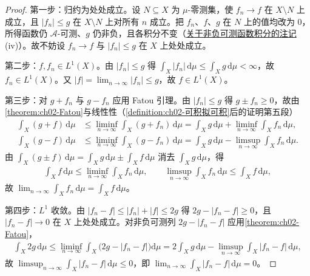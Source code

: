\documentclass[../../main.tex]{subfiles}%
\begin{document}
\begin{proof}
第一步：归约为处处成立。设 $N\subseteq X$ 为 $\mu$-零测集，使 $f_n\to f$ 在 $X\setminus N$ 上成立，且 $|f_n|\leqslant g$ 在 $X\setminus N$ 上对所有 $n$ 成立。把 $f_n$、$f$、$g$ 在 $N$ 上的值均改为 $0$，所得函数仍 $\mathscr A$-可测、$g$ 仍非负，且各积分不变（\hyperref[remark:ch02-非负可测积分动机]{关于非负可测函数积分的注记}(iv)）。故不妨设 $f_n\to f$ 与 $|f_n|\leqslant g$ 在 $X$ 上处处成立。

第二步：$f,f_n\in L^1(X)$。由 $|f_n|\leqslant g$ 得 $\int_X|f_n|\,\mathrm{d}\mu\leqslant\int_Xg\,\mathrm{d}\mu<\infty$，故 $f_n\in L^1(X)$。又 $|f|=\lim_{n\to\infty}|f_n|\leqslant g$，故 $f\in L^1(X)$。

第三步：对 $g+f_n$ 与 $g-f_n$ 应用 Fatou 引理。由 $|f_n|\leqslant g$ 得 $g\pm f_n\geqslant0$，故由\cref{theorem:ch02-Fatou}与线性性（\cref{definition:ch02-可积拟可积}后的证明第五段）
\begin{align*}
\int_X(g+f)\,\mathrm{d}\mu&\leqslant\liminf_{n\to\infty}\int_X(g+f_n)\,\mathrm{d}\mu
=\int_Xg\,\mathrm{d}\mu+\liminf_{n\to\infty}\int_Xf_n\,\mathrm{d}\mu,\\
\int_X(g-f)\,\mathrm{d}\mu&\leqslant\liminf_{n\to\infty}\int_X(g-f_n)\,\mathrm{d}\mu
=\int_Xg\,\mathrm{d}\mu-\limsup_{n\to\infty}\int_Xf_n\,\mathrm{d}\mu.
\end{align*}
由 $\int_X(g\pm f)\,\mathrm{d}\mu=\int_Xg\,\mathrm{d}\mu\pm\int_Xf\,\mathrm{d}\mu$ 消去 $\int_Xg\,\mathrm{d}\mu$，得
\begin{align*}
\int_Xf\,\mathrm{d}\mu\leqslant\liminf_{n\to\infty}\int_Xf_n\,\mathrm{d}\mu,\qquad
\limsup_{n\to\infty}\int_Xf_n\,\mathrm{d}\mu\leqslant\int_Xf\,\mathrm{d}\mu,
\end{align*}
故 $\lim_{n\to\infty}\int_Xf_n\,\mathrm{d}\mu=\int_Xf\,\mathrm{d}\mu$。

第四步：$L^1$ 收敛。由 $|f_n-f|\leqslant|f_n|+|f|\leqslant2g$ 得 $2g-|f_n-f|\geqslant0$，且 $|f_n-f|\to0$ 在 $X$ 上处处成立。对非负可测列 $2g-|f_n-f|$ 应用\cref{theorem:ch02-Fatou}，
\begin{align*}
\int_X2g\,\mathrm{d}\mu\leqslant\liminf_{n\to\infty}\int_X\big(2g-|f_n-f|\big)\mathrm{d}\mu
=2\int_Xg\,\mathrm{d}\mu-\limsup_{n\to\infty}\int_X|f_n-f|\,\mathrm{d}\mu,
\end{align*}
故 $\limsup_{n\to\infty}\int_X|f_n-f|\,\mathrm{d}\mu\leqslant0$，即 $\lim_{n\to\infty}\int_X|f_n-f|\,\mathrm{d}\mu=0$。
\end{proof}
\end{document}
